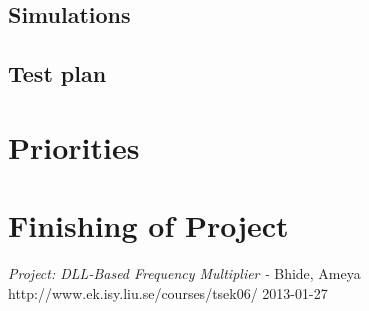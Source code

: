 \documentclass[a4paper,12pt]{article} \usepackage{graphicx}
\begin{document}
\subsection{Simulations} 
\subsection{Test plan}
\section{Priorities}

\section{Finishing of Project}

\newpage 
\appendix 
\newpage


\begin{thebibliography}{99}
\textit{Project: DLL-Based Frequency Multiplier - } Bhide, Ameya
\\ http://www.ek.isy.liu.se/courses/tsek06/ 2013-01-27
\end{thebibliography}
\end{document}
